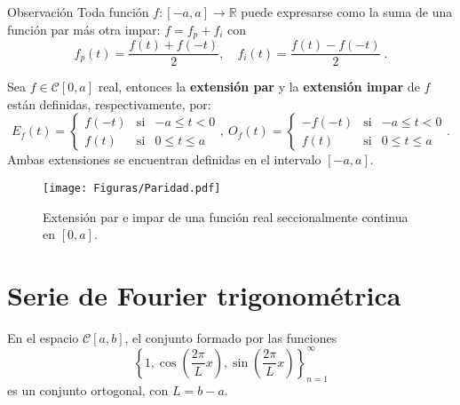 \begin{obs}{Observación}
    Toda función $f:[-a,a] \longrightarrow \mathbb{R}$ puede expresarse como la suma de una función par más otra impar: $f = f_p + f_i$ con 
    \begin{equation*}
        f_p(t) = \frac{f(t) + f(-t)}{2}, \quad f_i(t) = \frac{f(t) - f(-t)}{2} \ .
    \end{equation*}
\end{obs}

\begin{defi} 
Sea $f \in \mathscr{C}[0,a]$ real, entonces la \textbf{extensión par} y la \textbf{extensión impar} de $f$ están definidas, respectivamente, por:
\begin{equation*}
    E_f(t) = \left\{ \begin{array}{cll}
    f(-t)     & \mbox{si} & -a \leq t < 0 \\
    f(t)     & \mbox{si} & 0 \leq t \leq a
    \end{array} \right. , ~ O_f(t) = \left\{ \begin{array}{cll}
    -f(-t)     & \mbox{si} & -a \leq t < 0 \\
    f(t)     & \mbox{si} & 0 \leq t \leq a
    \end{array} \right. .
\end{equation*}
Ambas extensiones se encuentran definidas en el intervalo $[-a,a]$.
\end{defi}

\begin{figure}[H]
    \centering
    \texttt{[image: Figuras/Paridad.pdf]}
    \caption{Extensión par e impar de una función real seccionalmente continua en $[0,a]$. }
\end{figure}

\section{Serie de Fourier trigonométrica}


\begin{propo}
    En el espacio $\mathscr{C}[a,b]$, el conjunto formado por las funciones
    $$\left\{ 1, \cos\left( \frac{2\pi}{L}x \right), \sin\left( \frac{2\pi}{L}x \right) \right\}_{n=1}^{\infty}$$
    es un conjunto ortogonal, con $L = b-a$.
\end{propo}


